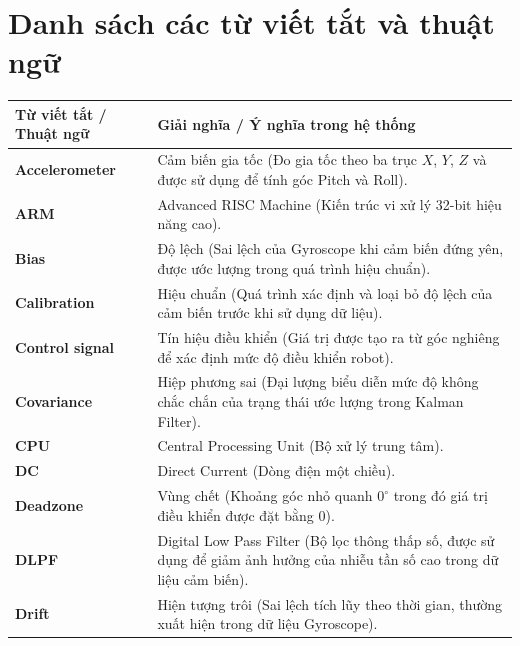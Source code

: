 {}
{
    \setlength{\parskip}{6pt}
    \tableofcontents
}

{}
{
    \setlength{\parskip}{6pt}
    \listoftables
}
{}
{
    \setlength{\parskip}{6pt}
    \listoffigures
}

{}
\chapter*{Danh sách các từ viết tắt và thuật ngữ}

\renewcommand{\arraystretch}{1.3}
\noindent
\begin{tabular}{|p{4.3cm}|p{10.7cm}|}
\hline
\textbf{Từ viết tắt / Thuật ngữ} & \textbf{Giải nghĩa / Ý nghĩa trong hệ thống} \\
\hline
\textbf{Accelerometer} & Cảm biến gia tốc (Đo gia tốc theo ba trục $X$, $Y$, $Z$ và được sử dụng để tính góc Pitch và Roll). \\ \hline
\textbf{ARM} & Advanced RISC Machine (Kiến trúc vi xử lý 32-bit hiệu năng cao). \\ \hline
\textbf{Bias} & Độ lệch (Sai lệch của Gyroscope khi cảm biến đứng yên, được ước lượng trong quá trình hiệu chuẩn). \\ \hline
\textbf{Calibration} & Hiệu chuẩn (Quá trình xác định và loại bỏ độ lệch của cảm biến trước khi sử dụng dữ liệu). \\ \hline
\textbf{Control signal} & Tín hiệu điều khiển (Giá trị được tạo ra từ góc nghiêng để xác định mức độ điều khiển robot). \\ \hline
\textbf{Covariance} & Hiệp phương sai (Đại lượng biểu diễn mức độ không chắc chắn của trạng thái ước lượng trong Kalman Filter). \\ \hline
\textbf{CPU} & Central Processing Unit (Bộ xử lý trung tâm). \\ \hline
\textbf{DC} & Direct Current (Dòng điện một chiều). \\ \hline
\textbf{Deadzone} & Vùng chết (Khoảng góc nhỏ quanh $0^\circ$ trong đó giá trị điều khiển được đặt bằng $0$). \\ \hline
\textbf{DLPF} & Digital Low Pass Filter (Bộ lọc thông thấp số, được sử dụng để giảm ảnh hưởng của nhiễu tần số cao trong dữ liệu cảm biến). \\ \hline
\textbf{Drift} & Hiện tượng trôi (Sai lệch tích lũy theo thời gian, thường xuất hiện trong dữ liệu Gyroscope). \\ \hline

\end{tabular}

